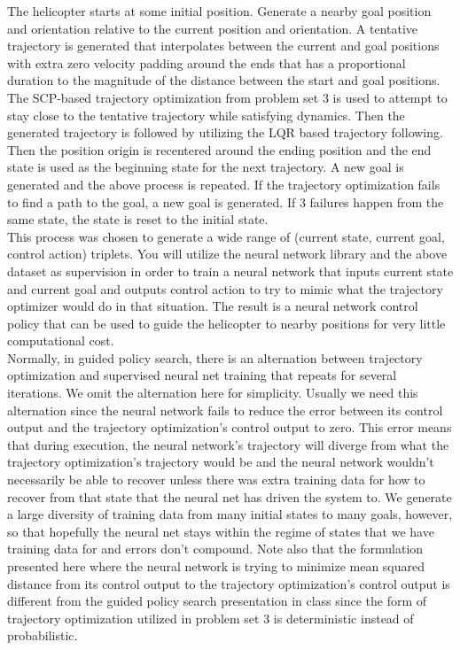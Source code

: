 \documentclass{article}
\begin{document}
The helicopter starts at some initial position.  
Generate a nearby goal position and orientation relative to the current position and orientation.
A tentative trajectory is generated that interpolates between the current and goal positions with extra zero velocity padding around the ends 
that has a proportional duration to the magnitude of the distance between the start and goal positions.
The SCP-based trajectory optimization from problem set 3 is used to attempt to stay close to the tentative trajectory while satisfying dynamics.
Then the generated trajectory is followed by utilizing the LQR based trajectory following.
Then the position origin is recentered around the ending position and the end state is used as the beginning state for the next trajectory.
A new goal is generated and the above process is repeated.
If the trajectory optimization fails to find a path to the goal, a new goal is generated.
If 3 failures happen from the same state, the state is reset to the initial state.
\\

This process was chosen to generate a wide range of (current state, current goal, control action) triplets.
You will utilize the neural network library and the above dataset as supervision in order to train a neural network that inputs current state 
and current goal and outputs control action to try to mimic what the trajectory optimizer would do in that situation.
The result is a neural network control policy that can be used to guide the helicopter to nearby positions for very little computational cost.
\\

Normally, in guided policy search, there is an alternation between trajectory optimization and supervised neural net training that repeats for several iterations.
We omit the alternation here for simplicity.
Usually we need this alternation since the neural network fails to reduce the error between its control output and the trajectory optimization's control output to zero.
This error means that during execution, the neural network's trajectory will diverge from what the trajectory optimization's trajectory would be and the neural network 
wouldn't necessarily be able to recover unless there was extra training data for how to recover from that state that the neural net has driven the system to.
We generate a large diversity of training data from many initial states to many goals, however, so that hopefully the neural net stays within the regime of states that we have training data for
and errors don't compound.
Note also that the formulation presented here where the neural network is trying to minimize mean squared distance from its control output to the trajectory optimization's control output is 
different from the guided policy search presentation in class since the form of trajectory optimization utilized in problem set 3 is deterministic instead of probabilistic.
\\
\end{document}
